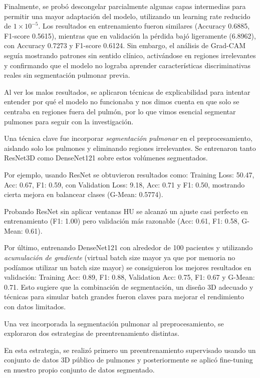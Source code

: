 Finalmente, se probó descongelar parcialmente algunas capas intermedias para permitir una mayor adaptación del modelo, utilizando un learning rate reducido de $1\times 10^{-5}$. Los resultados en entrenamiento fueron similares (Accuracy 0.6885, F1-score 0.5615), mientras que en validación la pérdida bajó ligeramente (6.8962), con Accuracy 0.7273 y F1-score 0.6124. Sin embargo, el análisis de Grad-CAM seguía mostrando patrones sin sentido clínico, activándose en regiones irrelevantes y confirmando que el modelo no lograba aprender características discriminativas reales sin segmentación pulmonar previa.

Al ver los malos resultados, se aplicaron técnicas de explicabilidad para intentar entender por qué el modelo no funcionaba y nos dimos cuenta en que solo se centraba en regiones fuera del pulmón, por lo que vimos esencial segmentar pulmones para seguir con la investigación. 


Una técnica clave fue incorporar \textit{segmentación pulmonar} en el preprocesamiento, aislando solo los pulmones y eliminando regiones irrelevantes. Se entrenaron tanto ResNet3D como DenseNet121 sobre estos volúmenes segmentados.

Por ejemplo, usando ResNet se obtuvieron resultados como: Training Loss: 50.47, Acc: 0.67, F1: 0.59, con Validation Loss: 9.18, Acc: 0.71 y F1: 0.50, mostrando cierta mejora en balancear clases (G-Mean: 0.5774). 

Probando ResNet sin aplicar ventanas HU se alcanzó un ajuste casi perfecto en entrenamiento (F1: 1.00) pero validación más razonable (Acc: 0.61, F1: 0.58, G-Mean: 0.61).

Por último, entrenando DenseNet121 con alrededor de 100 pacientes y utilizando \textit{acumulación de gradiente} (virtual batch size mayor ya que por memoria no podíamos utilizar un batch size mayor) se consiguieron los mejores resultados en validación: Training Acc: 0.89, F1: 0.88, Validation Acc: 0.75, F1: 0.67 y G-Mean: 0.71. Esto sugiere que la combinación de segmentación, un diseño 3D adecuado y técnicas para simular batch grandes fueron claves para mejorar el rendimiento con datos limitados.

Una vez incorporada la segmentación pulmonar al preprocesamiento, se exploraron dos estrategias de preentrenamiento distintas.

En esta estrategia, se realizó primero un preentrenamiento supervisado usando un conjunto de datos 3D público de pulmones y posteriormente se aplicó fine-tuning en nuestro propio conjunto de datos segmentado.


